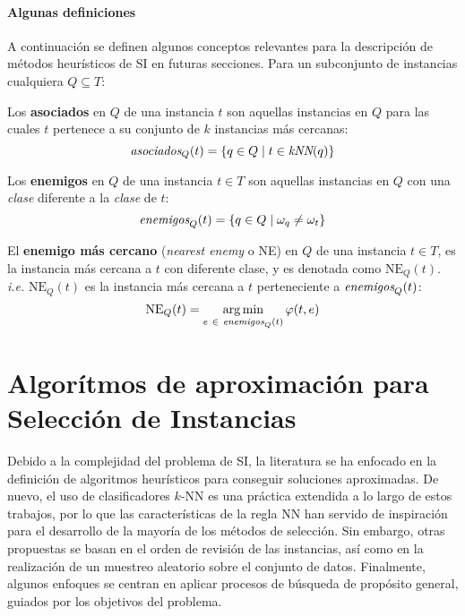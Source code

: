 \paragraph*{Algunas definiciones}
A continuación se definen algunos conceptos relevantes para la descripción de métodos heurísticos de SI en futuras secciones. Para un subconjunto de instancias cualquiera $Q \subseteq T$:\\

\begin{definicion}
Los \textbf{asociados} en $Q$ de una instancia $t$ son aquellas instancias en $Q$ para las cuales $t$ pertenece a su conjunto de $k$ instancias más cercanas:
\begin{equation}
\emph{asociados}_Q(t) = \left\lbrace q \in Q \mid t\in \emph{kNN}(q) \right\rbrace
\end{equation}
\end{definicion}

\begin{definicion}
Los \textbf{enemigos} en $Q$ de una instancia $t \in T$ son aquellas instancias en $Q$ con una \emph{clase} diferente a la \emph{clase} de $t$:
\begin{equation}
\emph{enemigos}_Q(t) = \left\lbrace q \in Q \mid \omega_{q} \neq \omega_{t} \right\rbrace
\end{equation}
\end{definicion}

\begin{definicion}
El \textbf{enemigo más cercano} (\emph{nearest enemy} o NE) en $Q$ de una instancia $t \in T$, es la instancia más cercana a $t$ con diferente clase, y es denotada como $\mathrm{NE}_Q(t)$. \emph{i.e.} $\mathrm{NE}_Q(t)$ es la instancia más cercana a $t$ perteneciente a $\emph{enemigos}_Q(t)$:
\begin{equation}
\mathrm{NE}_Q(t) = \operatorname*{arg\,min}_{e\ \in\ \emph{enemigos}_Q(t)} \varphi(t,e)
\end{equation}
\end{definicion}

\section{Algorítmos de aproximación para Selección de Instancias}
\label{alg-aprox-si}

Debido a la complejidad del problema de SI, la literatura se ha enfocado en la definición de algoritmos heurísticos para conseguir soluciones aproximadas. De nuevo, el uso de clasificadores $k$-NN es una práctica extendida a lo largo de estos trabajos, por lo que las características de la regla NN han servido de inspiración para el desarrollo de la mayoría de los métodos de selección. Sin embargo, otras propuestas se basan en el orden de revisión de las instancias, así como en la realización de un muestreo aleatorio sobre el conjunto de datos. Finalmente, algunos enfoques se centran en aplicar procesos de búsqueda de propósito general, guiados por los objetivos del problema.

